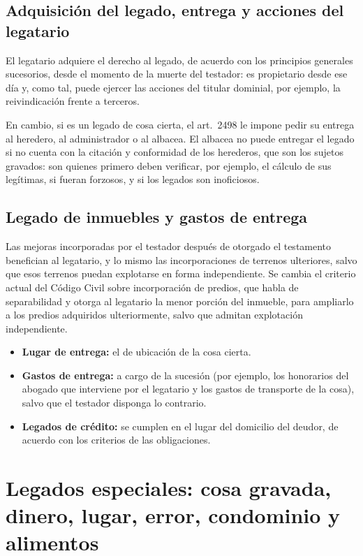 \documentclass[12pt,oneside]{book}
\begin{document}
\subsection{Adquisición del legado, entrega y acciones del legatario}

El legatario adquiere el derecho al legado, de acuerdo con los principios generales sucesorios, desde el momento de la muerte del testador: es propietario desde ese día y, como tal, puede ejercer las acciones del titular dominial, por ejemplo, la reivindicación frente a terceros.

En cambio, si es un legado de cosa cierta, el art.~2498 le impone pedir su entrega al heredero, al administrador o al albacea. El albacea no puede entregar el legado si no cuenta con la citación y conformidad de los herederos, que son los sujetos gravados: son quienes primero deben verificar, por ejemplo, el cálculo de sus legítimas, si fueran forzosos, y si los legados son inoficiosos.

\subsection{Legado de inmuebles y gastos de entrega}

Las mejoras incorporadas por el testador después de otorgado el testamento benefician al legatario, y lo mismo las incorporaciones de terrenos ulteriores, salvo que esos terrenos puedan explotarse en forma independiente. Se cambia el criterio actual del Código Civil sobre incorporación de predios, que habla de separabilidad y otorga al legatario la menor porción del inmueble, para ampliarlo a los predios adquiridos ulteriormente, salvo que admitan explotación independiente.

\begin{itemize}
    \item \textbf{Lugar de entrega:} el de ubicación de la cosa cierta.
    \item \textbf{Gastos de entrega:} a cargo de la sucesión (por ejemplo, los honorarios del abogado que interviene por el legatario y los gastos de transporte de la cosa), salvo que el testador disponga lo contrario.
    \item \textbf{Legados de crédito:} se cumplen en el lugar del domicilio del deudor, de acuerdo con los criterios de las obligaciones.
\end{itemize}

\section[Legados especiales]{Legados especiales: cosa gravada, dinero, lugar, error, condominio y alimentos}
\end{document}

